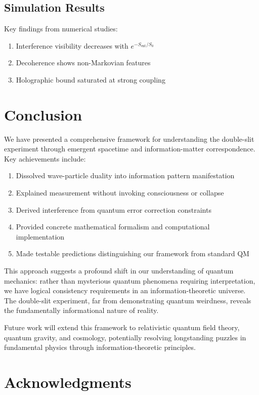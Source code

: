 \documentclass[12pt,a4paper]{article}
\begin{document}
\subsection{Simulation Results}

Key findings from numerical studies:
\begin{enumerate}
\item Interference visibility decreases with $e^{-S_{\text{ent}}/S_0}$
\item Decoherence shows non-Markovian features
\item Holographic bound saturated at strong coupling
\end{enumerate}

\section{Conclusion}

We have presented a comprehensive framework for understanding the double-slit experiment through emergent spacetime and information-matter correspondence. Key achievements include:

\begin{enumerate}
\item Dissolved wave-particle duality into information pattern manifestation
\item Explained measurement without invoking consciousness or collapse
\item Derived interference from quantum error correction constraints
\item Provided concrete mathematical formalism and computational implementation
\item Made testable predictions distinguishing our framework from standard QM
\end{enumerate}

This approach suggests a profound shift in our understanding of quantum mechanics: rather than mysterious quantum phenomena requiring interpretation, we have logical consistency requirements in an information-theoretic universe. The double-slit experiment, far from demonstrating quantum weirdness, reveals the fundamentally informational nature of reality.

Future work will extend this framework to relativistic quantum field theory, quantum gravity, and cosmology, potentially resolving longstanding puzzles in fundamental physics through information-theoretic principles.

\section*{Acknowledgments}
\end{document}
